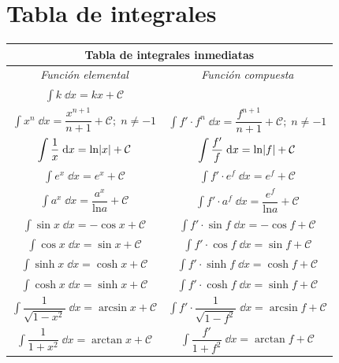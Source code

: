 \chapter{Tabla de integrales}
\label{app:tabla-integrales}
\begin{table}[H]
\centering
\def\arraystretch{2}
\begin{tabular}{|c|c|}
\hline
\multicolumn{2}{|c|}{Tabla de integrales inmediatas} \\ \hline
      \emph{Función elemental} & 	\emph{Función compuesta}      \\ \hline
  $\displaystyle \int k \; \dd x=kx+\mathcal{C}$    &  $\quad$        \\ \hline
   $\displaystyle \int x^n \; \dd x = \dfrac {x^{n+1}}{n+1} +\mathcal{C}; \; n\neq -1$         &   $\displaystyle \int f'\cdot  f^n \; \dd x = \dfrac {f^{n+1}}{n+1} +\mathcal{C}; \; n\neq -1$          \\ \hline
     $\displaystyle \displaystyle \int {\dfrac 1 x \; \dd x} = \mathrm{ln}|x|+\mathcal{C}$      &     $\displaystyle \displaystyle \int {\dfrac {f'} {f} \; \dd x} = \mathrm{ln}|f|+\mathcal{C}$       \\ \hline
 $\displaystyle \int e^x\; \dd x= e^x +\mathcal{C}$          &    $\displaystyle \int f' \cdot  e^f\; \dd x= e^f +\mathcal{C}$         \\ \hline
  $\displaystyle \int a^x\; \dd x= \dfrac {a^x}{\mathrm{ln}a} +\mathcal{C}$          &    $\displaystyle \int f' \cdot  a^f\; \dd x= \dfrac{e^f}{\mathrm{ln}a} +\mathcal{C}$         \\ \hline
  $\displaystyle \int \sin x \; \dd x= - \cos x + \mathcal{C}$         &  $\displaystyle \int f'\cdot \sin f \; \dd x= - \cos f + \mathcal{C}$           \\ \hline
    $\displaystyle \int \cos x \; \dd x=\sin x + \mathcal{C}$         &  $\displaystyle \int f'\cdot \cos f \; \dd x= \sin f + \mathcal{C}$           \\ \hline
     $\displaystyle \int \sinh x \; \dd x=  \cosh x + \mathcal{C}$         &  $\displaystyle \int f'\cdot \sinh f \; \dd x= \cosh f + \mathcal{C}$           \\ \hline
        $\displaystyle \int \cosh x \; \dd x=  \sinh x + \mathcal{C}$         &  $\displaystyle \int f'\cdot \cosh f \; \dd x= \sinh f + \mathcal{C}$           \\ \hline
    $\displaystyle \int \dfrac {1}{\sqrt{1-x^2}}\; \dd x = \arcsin x + \mathcal{C}$       &      $\displaystyle \int f' \cdot \dfrac {1}{\sqrt{1-f^2}}\; \dd x = \arcsin f + \mathcal{C}$         \\ \hline
     $\displaystyle \int \dfrac {1}{1+x^2}\; \dd x = \arctan x + \mathcal{C}$      &     $\displaystyle \int \dfrac {f'}{1+f^2}\; \dd x = \arctan f + \mathcal{C}$        \\ \hline
\end{tabular}
\end{table}

